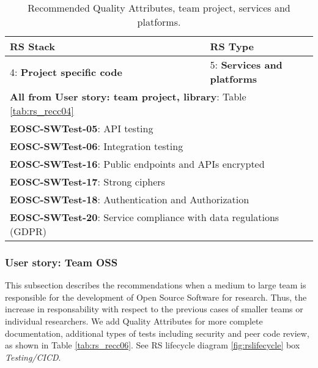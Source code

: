 \begin{center}
\begin{table}

  \small
  \begin{tabular}{|p{0.65\linewidth}|p{0.35\linewidth}|} \hline

    \textbf{RS Stack} & \textbf{RS Type} \\ \hline \hline
    4: \textbf{Project specific code} &
    5: \textbf{Services and platforms} \\ \hline \hline
    \multicolumn{2}{|l|}{\textbf{All from User story: team project, library}: Table \ref{tab:rs_recc04}} \\ \hline
    \multicolumn{2}{|l|}{\textbf{EOSC-SWTest-05}: API testing} \\ \hline
    \multicolumn{2}{|l|}{\textbf{EOSC-SWTest-06}: Integration testing} \\ \hline
    \multicolumn{2}{|l|}{\textbf{EOSC-SWTest-16}: Public endpoints and APIs encrypted} \\ \hline
    \multicolumn{2}{|l|}{\textbf{EOSC-SWTest-17}: Strong ciphers} \\ \hline
    \multicolumn{2}{|l|}{\textbf{EOSC-SWTest-18}: Authentication and Authorization} \\ \hline
    \multicolumn{2}{|l|}{\textbf{EOSC-SWTest-20}: Service compliance with data regulations (GDPR)} \\ \hline

  \end{tabular}
  \caption{Recommended Quality Attributes, team project, services and platforms.}
  \label{tab:rs_recc05}
\end{table}
\end{center}

\subsubsection{User story: Team OSS}

This subsection describes the recommendations when a medium to large team is responsible for the development of Open Source Software for research. Thus, the increase in responsability with respect to the previous cases of smaller teams or individual researchers. We add Quality Attributes for more complete documentation, additional types of tests including security and peer code review, as shown in Table \ref{tab:rs_recc06}. See RS lifecycle diagram \ref{fig:rslifecycle} box \textit{Testing/CICD}.


